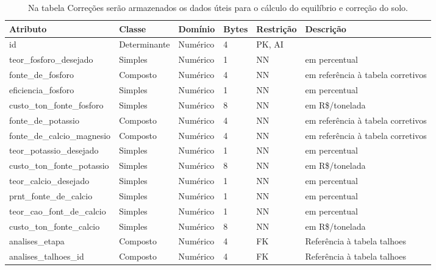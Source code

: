 \begin{landscape}
    \begin{table}[H]
        \centering
        \caption[Tabela correções]{Na tabela Correções serão armazenados os dados úteis para o cálculo do equilíbrio e correção do solo.
            \label{tab:tabela-er-correcoes}}
        \begin{tabular}{|p{4cm}|p{3cm}|p{2cm}|p{1cm}|p{2cm}|p{8cm}|}
            \hline
            Atributo                    & Classe       & Domínio  & Bytes & Restrição & Descrição                         \\\hline
            id                          & Determinante & Numérico & 4     & PK, AI    &                                   \\\hline
            teor\_fosforo\_desejado     & Simples      & Numérico & 1     & NN        & em percentual                     \\\hline
            fonte\_de\_fosforo          & Composto     & Numérico & 4     & NN        & em referência à tabela corretivos \\\hline
            eficiencia\_fosforo         & Simples      & Numérico & 1     & NN        & em percentual                     \\\hline
            custo\_ton\_fonte\_fosforo  & Simples      & Numérico & 8     & NN        & em R\$/tonelada                   \\\hline
            fonte\_de\_potassio         & Composto     & Numérico & 4     & NN        & em referência à tabela corretivos \\\hline
            fonte\_de\_calcio\_magnesio & Composto     & Numérico & 4     & NN        & em referência à tabela corretivos \\\hline
            teor\_potassio\_desejado    & Simples      & Numérico & 1     & NN        & em percentual                     \\\hline
            custo\_ton\_fonte\_potassio & Simples      & Numérico & 8     & NN        & em R\$/tonelada                   \\\hline
            teor\_calcio\_desejado      & Simples      & Numérico & 1     & NN        & em percentual                     \\\hline
            prnt\_fonte\_de\_calcio     & Simples      & Numérico & 1     & NN        & em percentual                     \\\hline
            teor\_cao\_font\_de\_calcio & Simples      & Numérico & 1     & NN        & em percentual                     \\\hline
            custo\_ton\_fonte\_calcio   & Simples      & Numérico & 8     & NN        & em R\$/tonelada                   \\\hline
            analises\_etapa             & Composto     & Numérico & 4     & FK        & Referência à tabela talhoes       \\\hline
            analises\_talhoes\_id       & Composto     & Numérico & 4     & FK        & Referência à tabela talhoes       \\\hline
        \end{tabular}
    \end{table}


\end{landscape}
